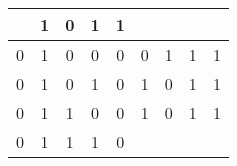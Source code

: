 \begin{tabular}{|c|c|c|c||c|c|c|c|c|}
    
    
    & 1
  
    
    
    & 0
  
    
    
    & 1
  
    
    
    & 1
   \\
  \hline

  
  
  0 & 1 & 0 & 0
  
    
    
    & 0
  
    
    
    & 0
  
    
    
    & 1
  
    
    
    & 1
  
    
    
    & 1
   \\
  

  
  
  0 & 1 & 0 & 1
  
    
    
    & 0
  
    
    
    & 1
  
    
    
    & 0
  
    
    
    & 1
  
    
    
    & 1
   \\
  

  
  
  0 & 1 & 1 & 0
  
    
    
    & 0
  
    
    
    & 1
  
    
    
    & 0
  
    
    
    & 1
  
    
    
    & 1
   \\
  

  
  
  0 & 1 & 1 & 1
  
    
    
    & 0
  

\end{tabular}
